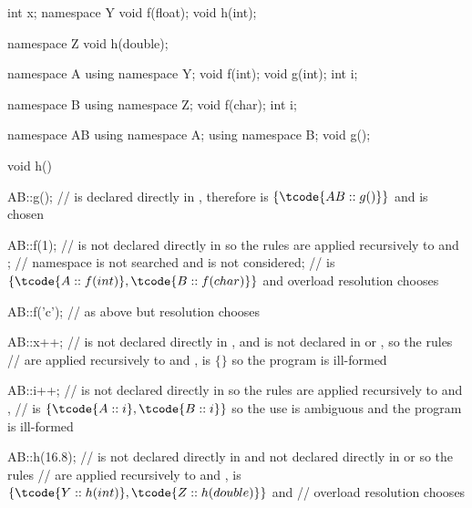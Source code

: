 \begin{example}
\begin{codeblock}
int x;
namespace Y {
  void f(float);
  void h(int);
}

namespace Z {
  void h(double);
}

namespace A {
  using namespace Y;
  void f(int);
  void g(int);
  int i;
}

namespace B {
  using namespace Z;
  void f(char);
  int i;
}

namespace AB {
  using namespace A;
  using namespace B;
  void g();
}

void h()
{
  AB::g();      //  is declared directly in , therefore  is $\{ \tcode{AB::g()} \}$ and  is chosen

  AB::f(1);     //  is not declared directly in  so the rules are applied recursively to  and ;
                // namespace  is not searched and  is not considered;
                //  is $\{ \tcode{A::f(int)}, \tcode{B::f(char)} \}$ and overload resolution chooses 

  AB::f('c');   // as above but resolution chooses 

  AB::x++;      //  is not declared directly in , and is not declared in  or , so the rules
                // are applied recursively to  and ,  is $\{ \}$ so the program is ill-formed

  AB::i++;      //  is not declared directly in  so the rules are applied recursively to  and ,
                //  is $\{ \tcode{A::i}, \tcode{B::i} \}$ so the use is ambiguous and the program is ill-formed

  AB::h(16.8);  //  is not declared directly in  and not declared directly in  or  so the rules
                // are applied recursively to  and ,  is $\{ \tcode{Y::h(int)}, \tcode{Z::h(double)} \}$ and
                // overload resolution chooses 
}
\end{codeblock}
\end{example}

